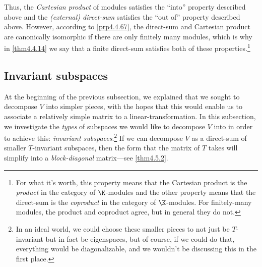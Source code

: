 Thus, the \emph{Cartesian product} of modules satisfies the ``into'' property described above and the \emph{(external) direct-sum} satisfies the ``out of'' property described above.  However, according to \cref{prp4.4.67}, the direct-sum and Cartesian product are canonically isomorphic if there are only finitely many modules, which is why in \cref{thm4.4.14} we say that a finite direct-sum satisfies both of these properties.\footnote{For what it's worth, this property means that the Cartesian product is the \emph{product} in the category of $\K$-modules and the other property means that the direct-sum is the \emph{coproduct} in the category of $\K$-modules.  For finitely-many modules, the product and coproduct agree, but in general they do not.}

\subsection{Invariant subspaces}

At the beginning of the previous subsection, we explained that we sought to decompose $V$ into simpler pieces, with the hopes that this would enable us to associate a relatively simple matrix to a linear-transformation.  In this subsection, we investigate the \emph{types} of subspaces we would like to decompose $V$ into in order to achieve this:  \emph{invariant subspaces}.\footnote{In an ideal world, we could choose these smaller pieces to not just be $T$-invariant but in fact be eigenspaces, but of course, if we could do that, everything would be diagonalizable, and we wouldn't be discussing this in the first place.}  If we can decompose $V$ as a direct-sum of smaller $T$-invariant subspaces, then the form that the matrix of $T$ takes will simplify into a \emph{block-diagonal} matrix---see \cref{thm4.5.2}.

